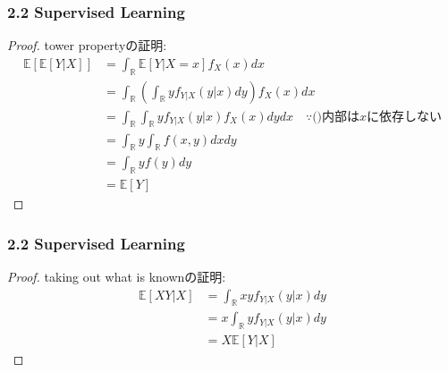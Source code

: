 \documentclass[dvipdfmx,cjk]{beamer}
\theoremstyle{example}
\begin{document}
\begin{frame}
    \frametitle{2.2 Supervised Learning}
    \begin{proof}
        tower propertyの証明:
        \begin{align*}
            \mathbb{E}[\mathbb{E}[Y|X]] & =\int_\mathbb{R}\mathbb{E}[Y|X=x]f_X(x)dx                                                               \\
                                        & =\int_\mathbb{R}\left(\int_\mathbb{R}yf_{Y|X}(y|x)dy\right)f_X(x)dx                                     \\
                                        & =\int_\mathbb{R}\int_\mathbb{R}yf_{Y|X}(y|x)f_X(x)dydx              \quad \because\text{()内部は$x$に依存しない} \\
                                        & = \int_\mathbb{R}y\int_\mathbb{R}f(x,y)dxdy                                                             \\
                                        & =\int_\mathbb{R}yf(y)dy                                                                                 \\
                                        & =\mathbb{E}[Y]
        \end{align*}

    \end{proof}
\end{frame}
\begin{frame}
    \frametitle{2.2 Supervised Learning}
    \begin{proof}
        taking out what is knownの証明:
        \begin{align*}
            \mathbb{E}[XY|X] & =\int_\mathbb{R}xyf_{Y|X}(y|x)dy \\
                             & =x\int_\mathbb{R}yf_{Y|X}(y|x)dy \\
                             & =X\mathbb{E}[Y|X]
        \end{align*}
    \end{proof}
\end{frame}
\end{document}
